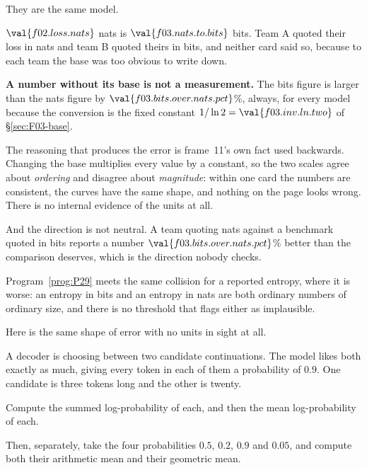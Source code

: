 \begin{fr}
\begin{ansblock}
They are the same model.

$\val{f02.loss.nats}$ nats is $\val{f03.nats.to.bits}$ bits. Team A quoted
their loss in nats and team B quoted theirs in bits, and neither card said so,
because to each team the base was too obvious to write down.
\end{ansblock}

\begin{trapbox}
\textbf{A number without its base is not a measurement.} The bits figure is
larger than the nats figure by $\val{f03.bits.over.nats.pct}$\%, always, for
every model \dash{} because the conversion is the fixed constant
$1 / \ln 2 = \val{f03.inv.ln.two}$ of \S\ref{sec:F03-base}.

The reasoning that produces the error is frame~11's own fact used backwards.
Changing the base multiplies every value by a constant, so the two scales agree
about \emph{ordering} and disagree about \emph{magnitude}: within one card the
numbers are consistent, the curves have the same shape, and nothing on the page
looks wrong. There is no internal evidence of the units at all.

And the direction is not neutral. A team quoting nats against a benchmark
quoted in bits reports a number $\val{f03.bits.over.nats.pct}$\% better than
the comparison deserves, which is the direction nobody checks.
\end{trapbox}

Program~\ref{prog:P29} meets the same collision for a reported entropy, where
it is worse: an entropy in bits and an entropy in nats are both ordinary
numbers of ordinary size, and there is no threshold that flags either as
implausible.
\end{fr}

\begin{fr}
Here is the same shape of error with no units in sight at all.

A decoder is choosing between two candidate continuations. The model likes both
exactly as much, giving every token in each of them a probability of
$\num{0.9}$. One candidate is three tokens long and the other is twenty.

Compute the summed log-probability of each, and then the mean log-probability
of each.

Then, separately, take the four probabilities $\num{0.5}$, $\num{0.2}$,
$\num{0.9}$ and $\num{0.05}$, and compute both their arithmetic mean and their
geometric mean.
\dotline
\nextframe
\end{fr}

